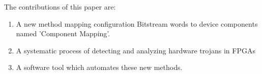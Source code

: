 \documentclass[conference]{IEEEtran}
\begin{document}
The contributions of this paper are:
\begin{enumerate}
	\item A new method mapping configuration \gls{Bitstream} words to device components named 'Component Mapping'.
	\item A systematic process of detecting and analyzing hardware trojans in \acrshort{FPGAs}
	\item A software tool which automates these new methods.
\end{enumerate}

\end{document}
